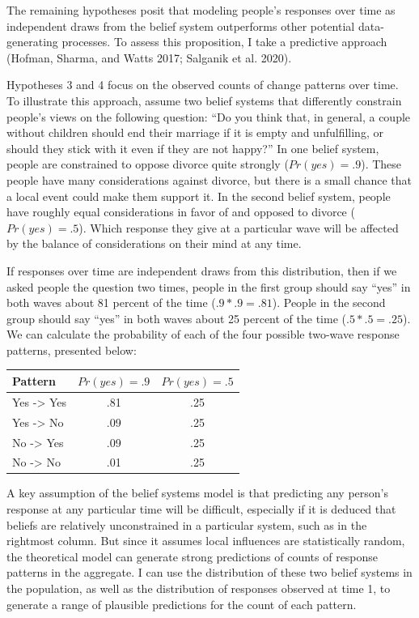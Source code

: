 \documentclass[12pt,]{article}
\begin{document}
The remaining hypotheses posit that modeling people's responses over time as independent draws from the belief system outperforms other potential data-generating processes. To assess this proposition, I take a predictive approach (Hofman, Sharma, and Watts 2017; Salganik et al. 2020).

Hypotheses 3 and 4 focus on the observed counts of change patterns over time. To illustrate this approach, assume two belief systems that differently constrain people's views on the following question: ``Do you think that, in general, a couple without children should end their marriage if it is empty and unfulfilling, or should they stick with it even if they are not happy?'' In one belief system, people are constrained to oppose divorce quite strongly (\(Pr(yes)=.9\)). These people have many considerations against divorce, but there is a small chance that a local event could make them support it. In the second belief system, people have roughly equal considerations in favor of and opposed to divorce (\(Pr(yes)=.5\)). Which response they give at a particular wave will be affected by the balance of considerations on their mind at any time.

If responses over time are independent draws from this distribution, then if we asked people the question two times, people in the first group should say ``yes'' in both waves about 81 percent of the time (\(.9 * .9 = .81\)). People in the second group should say ``yes'' in both waves about 25 percent of the time (\(.5 * .5 = .25\)). We can calculate the probability of each of the four possible two-wave response patterns, presented below:

\begin{longtable}[]{@{}lcc@{}}
\toprule
Pattern & \(Pr(yes)=.9\) & \(Pr(yes)=.5\)\tabularnewline
\midrule
\endhead
Yes -\textgreater{} Yes & .81 & .25\tabularnewline
Yes -\textgreater{} No & .09 & .25\tabularnewline
No -\textgreater{} Yes & .09 & .25\tabularnewline
No -\textgreater{} No & .01 & .25\tabularnewline
\bottomrule
\end{longtable}

A key assumption of the belief systems model is that predicting any person's response at any particular time will be difficult, especially if it is deduced that beliefs are relatively unconstrained in a particular system, such as in the rightmost column. But since it assumes local influences are statistically random, the theoretical model can generate strong predictions of counts of response patterns in the aggregate. I can use the distribution of these two belief systems in the population, as well as the distribution of responses observed at time 1, to generate a range of plausible predictions for the count of each pattern.
\end{document}
